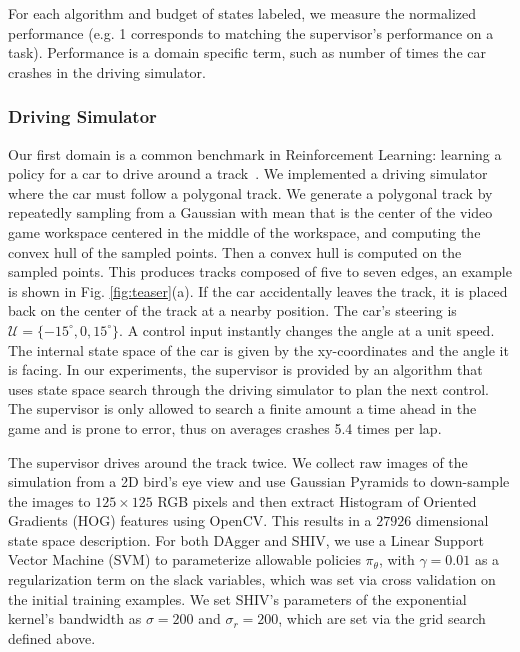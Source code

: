 \documentclass[10pt, conference]{ieeeconf}      %
\newcommand{\acro}{SHIV}
\begin{document}
For each algorithm and budget of states labeled, we measure the normalized performance (e.g. 1 corresponds to matching the supervisor's performance on a task). Performance is a domain specific term, such as number of times the car crashes in the driving simulator. 




\subsubsection{Driving Simulator}

Our first domain is a common benchmark in Reinforcement Learning: learning a policy for a car to drive around a track~\cite{argall2009survey,ross2010efficient,ross2011reduction}. We implemented a driving simulator where the car must follow a polygonal track. We generate a polygonal track by repeatedly sampling from a Gaussian with mean that is the center of the video game workspace centered in the middle of the workspace, and computing the convex hull of the sampled points. Then a convex hull is computed on the sampled points. This produces tracks composed of five to seven edges, an example is shown in Fig. \ref{fig:teaser}(a). If the car accidentally leaves the track, it is placed
back on the center of the track at a nearby position. The car's steering is  $\mathcal{U} = \lbrace
-15^\circ, 0, 15^\circ \rbrace$. A control input instantly changes the angle at a unit speed. 
The internal state space of the car is given by the
xy-coordinates and the angle it is facing. In our experiments, the supervisor is provided by an algorithm that uses
state space search through the driving simulator to plan the next control. The supervisor is only allowed to search a finite amount a time ahead in the game and is prone to error, thus on averages crashes 5.4 times per lap. 

The supervisor drives around the track twice. We collect raw images of the simulation from a 2D bird's eye view
and use Gaussian Pyramids to down-sample the images to $125 \times 125$ RGB pixels and then extract Histogram of
Oriented Gradients (HOG) features using OpenCV. This results in a $27926$ dimensional state space description.
For both DAgger and \acro, we use a Linear Support Vector Machine (SVM) to parameterize allowable
policies $\pi_{\theta}$, with $\gamma=0.01$ as a regularization term on the slack variables, which was set via cross
validation on the initial training examples. We set SHIV's parameters  of the exponential kernel's bandwidth as $\sigma = 200$ and $\sigma_r = 200$, which are set via the grid search defined above. 
\end{document}
